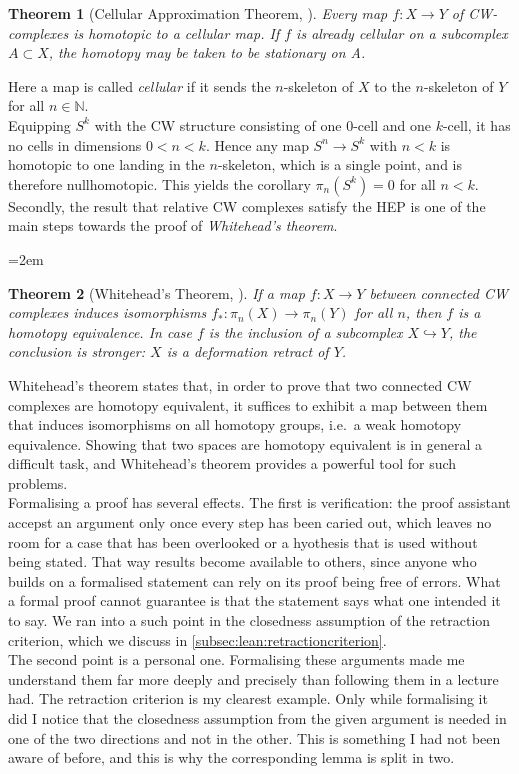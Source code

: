 \documentclass[11pt, a4paper, english]{article}
\theoremstyle{plain}
\newtheorem{theorem}{Theorem}
\theoremstyle{definition}
\theoremstyle{remark}
\numberwithin{equation}{section}
\numberwithin{theorem}{section}
\begin{document}
\begin{theorem}[Cellular Approximation Theorem, {\cite[Theorem 4.8]{HAT01}}] 
    Every map $f \colon X \to Y $ of CW-complexes is homotopic to a cellular map. If $f$ is already cellular on a subcomplex $A \subset X$, the homotopy may be taken to be stationary on A.
\end{theorem} 
Here a map is called \emph{cellular} if it sends the $n$-skeleton of $X$ to the $n$-skeleton of $Y$ for all $n \in \mathbb{N}$. \\
    Equipping $S^k$ with the CW structure consisting of one $0$-cell and one $k$-cell, it has no cells in dimensions $0 < n < k$. Hence any map $S^n \to S^k$ with $n < k$ is homotopic to one landing in the $n$-skeleton, which is a single point, and is therefore nullhomotopic. This yields the corollary $\pi_n(S^k) = 0$ for all $n < k$.
Secondly, the result that relative CW complexes satisfy the HEP is one of the main steps towards the proof of \emph{Whitehead's theorem}.
{\emergencystretch=2em
\begin{theorem}[Whitehead's Theorem, {\cite[Theorem 4.5]{HAT01}}]  \label{Whitehead}
    If a map $f \colon X \to Y$ between connected CW complexes induces isomorphisms $f_* \colon \pi_n (X) \to  \pi _n (Y) $ for all $n$, then $f$ is a homotopy equivalence. In case $f$ is the inclusion of a subcomplex $X \hookrightarrow Y$, the conclusion is stronger: $X$ is a deformation retract of $Y$.
\end{theorem}
\par}
    
Whitehead's theorem states that, in order to prove that two connected CW complexes are homotopy equivalent, it suffices to exhibit a map between them that induces isomorphisms on all homotopy groups, i.e.\ a weak homotopy equivalence. Showing that two spaces are homotopy equivalent is in general a difficult task, and Whitehead's theorem provides a powerful tool for such problems. \\
Formalising a proof has several effects. The first is verification: the proof assistant accepst an argument only once every step has been caried out, which leaves no room for a case that has been overlooked or a hyothesis that is used without being stated. That way results become available to others, since anyone who builds on a formalised statement can rely on its proof being free of errors. What a formal proof cannot guarantee is that the statement says what one intended it to say. We ran into a such point in the closedness assumption of the retraction criterion, which we discuss in \cref{subsec:lean:retractioncriterion}. \\
The second point is a personal one. Formalising these arguments made me understand them far more deeply and precisely than following them in a lecture had. The retraction criterion is my clearest example. Only while formalising it did I notice that the closedness assumption from the given argument is needed in one of the two directions and not in the other. This is something I had not been aware of before, and this is why the corresponding lemma is split in two. \\
\end{document}
